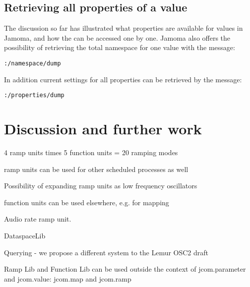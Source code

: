 \documentclass{sig-alternate}
\begin{document}

\subsection{Retrieving all properties of a value} %
\label{sub:retrieving_all_properties_of_a_value}

The discussion so far has illustrated what properties are available for values in Jamoma, and how the can be accessed one by one. Jamoma also offers the possibility of retrieving the total namespace for one value with the message: 

\texttt{:/namespace/dump}

In addition current settings for all properties can be retrieved by the message:

\texttt{:/properties/dump}






\section{Discussion and further work} %
\label{sec:discussion_and_further_work}

4 ramp units times 5 function units = 20 ramping modes

ramp units can be used for other scheduled processes as well

Possibility of expanding ramp units as low frequency oscillators

function units can be used elsewhere, e.g. for mapping

Audio rate ramp unit.

DataspaceLib

Querying - we propose a different system to the Lemur OSC2 draft

Ramp Lib and Function Lib can be used outside the context of jcom.parameter and jcom.value: jcom.map and jcom.ramp







\end{document}
